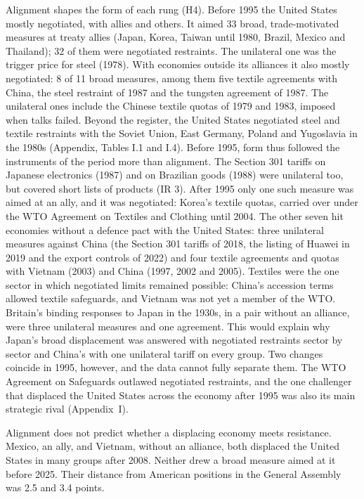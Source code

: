 \documentclass[review,authoryear,12pt]{elsarticle}
\begin{document}
Alignment shapes the form of each rung (H4). Before 1995 the United States mostly negotiated, with allies and others. It aimed 33 broad, trade-motivated measures at treaty allies (Japan, Korea, Taiwan until 1980, Brazil, Mexico and Thailand); 32 of them were negotiated restraints. The unilateral one was the trigger price for steel (1978). With economies outside its alliances it also mostly negotiated: 8 of 11 broad measures, among them five textile agreements with China, the steel restraint of 1987 and the tungsten agreement of 1987. The unilateral ones include the Chinese textile quotas of 1979 and 1983, imposed when talks failed. Beyond the register, the United States negotiated steel and textile restraints with the Soviet Union, East Germany, Poland and Yugoslavia in the 1980s (Appendix, Tables I.1 and I.4). Before 1995, form thus followed the instruments of the period more than alignment. The Section 301 tariffs on Japanese electronics (1987) and on Brazilian goods (1988) were unilateral too, but covered short lists of products (IR 3). After 1995 only one such measure was aimed at an ally, and it was negotiated: Korea's textile quotas, carried over under the WTO Agreement on Textiles and Clothing until 2004. The other seven hit economies without a defence pact with the United States: three unilateral measures against China (the Section 301 tariffs of 2018, the listing of Huawei in 2019 and the export controls of 2022) and four textile agreements and quotas with Vietnam (2003) and China (1997, 2002 and 2005). Textiles were the one sector in which negotiated limits remained possible: China's accession terms allowed textile safeguards, and Vietnam was not yet a member of the WTO. Britain's binding responses to Japan in the 1930s, in a pair without an alliance, were three unilateral measures and one agreement. This would explain why Japan's broad displacement was answered with negotiated restraints sector by sector and China's with one unilateral tariff on every group. Two changes coincide in 1995, however, and the data cannot fully separate them. The WTO Agreement on Safeguards outlawed negotiated restraints, and the one challenger that displaced the United States across the economy after 1995 was also its main strategic rival (Appendix~I).

Alignment does not predict whether a displacing economy meets resistance. Mexico, an ally, and Vietnam, without an alliance, both displaced the United States in many groups after 2008. Neither drew a broad measure aimed at it before 2025. Their distance from American positions in the General Assembly was 2.5 and 3.4 points.
\end{document}
